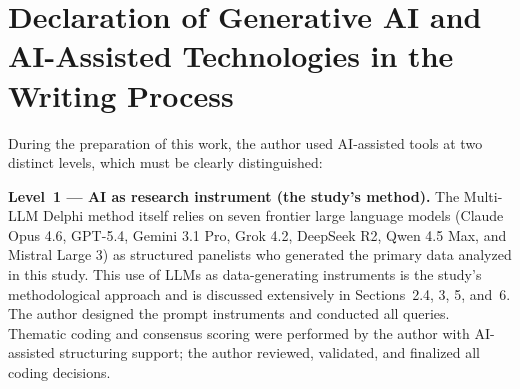 \documentclass[preprint,review,12pt]{elsarticle}
\begin{document}
\section*{Declaration of Generative AI and AI-Assisted Technologies in the Writing Process}

During the preparation of this work, the author used AI-assisted tools at two distinct levels, which must be clearly distinguished:

\textbf{Level~1 --- AI as research instrument (the study's method).} The Multi-LLM Delphi method itself relies on seven frontier large language models (Claude Opus 4.6, GPT-5.4, Gemini 3.1 Pro, Grok 4.2, DeepSeek R2, Qwen 4.5 Max, and Mistral Large 3) as structured panelists who generated the primary data analyzed in this study. This use of LLMs as data-generating instruments is the study's methodological approach and is discussed extensively in Sections~2.4, 3, 5, and~6. The author designed the prompt instruments and conducted all queries. Thematic coding and consensus scoring were performed by the author with AI-assisted structuring support; the author reviewed, validated, and finalized all coding decisions.
\end{document}
